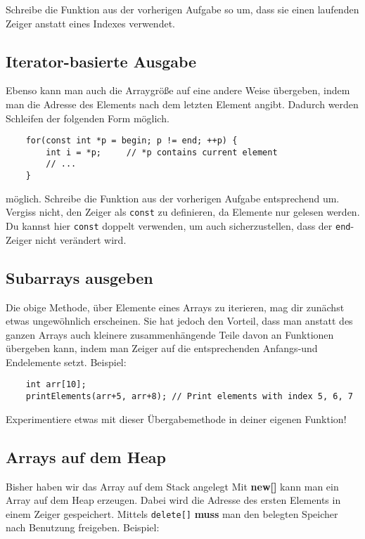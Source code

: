 Schreibe die Funktion aus der vorherigen Aufgabe so um, dass sie einen laufenden Zeiger anstatt eines Indexes verwendet.

\subsection{Iterator-basierte Ausgabe}
Ebenso kann man auch die Arraygröße auf eine andere Weise übergeben, indem man die Adresse des Elements nach dem letzten Element angibt.
Dadurch werden Schleifen der folgenden Form möglich.

\begin{lstlisting}
	for(const int *p = begin; p != end; ++p) {
		int i = *p;		// *p contains current element
		// ...
	}
\end{lstlisting}

möglich.
Schreibe die Funktion aus der vorherigen Aufgabe entsprechend um.
Vergiss nicht, den Zeiger als \lstinline{const} zu definieren, da Elemente nur gelesen werden.
Du kannst hier \lstinline{const} doppelt verwenden, um auch sicherzustellen, dass der \lstinline{end}-Zeiger nicht verändert wird.

\subsection{Subarrays ausgeben}
Die obige Methode, über Elemente eines Arrays zu iterieren, mag dir zunächst etwas ungewöhnlich erscheinen.
Sie hat jedoch den Vorteil, dass man anstatt des ganzen Arrays auch kleinere zusammenhängende Teile davon an Funktionen übergeben kann, indem man Zeiger auf die entsprechenden Anfangs-und Endelemente setzt.
Beispiel:

\begin{lstlisting}
	int arr[10];
	printElements(arr+5, arr+8); // Print elements with index 5, 6, 7
\end{lstlisting}

Experimentiere etwas mit dieser Übergabemethode in deiner eigenen Funktion!

\subsection{Arrays auf dem Heap}
Bisher haben wir das Array auf dem Stack angelegt
Mit \textbf{new[]} kann man ein Array auf dem Heap erzeugen.
Dabei wird die Adresse des ersten Elements in einem Zeiger gespeichert.
Mittels \lstinline{delete[]} \textbf{muss} man den belegten Speicher nach Benutzung freigeben.
Beispiel:

